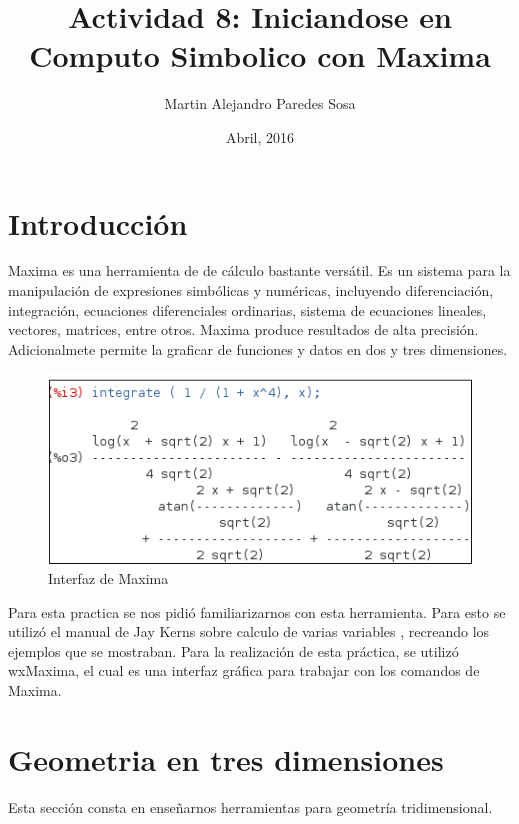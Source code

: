 \documentclass[12pt]{article}
\title{Actividad 8: Iniciandose en Computo Simbolico con Maxima}
\author{Martin Alejandro Paredes Sosa}
\date{Abril, 2016}
\begin{document}
\maketitle

\section{Introducción}
Maxima es una herramienta de de cálculo bastante versátil. Es un sistema para la manipulación de expresiones simbólicas y numéricas, incluyendo diferenciación, integración, ecuaciones diferenciales ordinarias, sistema de ecuaciones lineales, vectores, matrices, entre otros. Maxima produce resultados de alta precisión. Adicionalmete permite la graficar de funciones y datos en dos y tres dimensiones. \cite{M}

\begin{figure}[H]
\centering
\includegraphics[scale=0.75]{maxi.png}
\caption{Interfaz de Maxima}
\end{figure}

\hspace{0.5cm} Para esta practica se nos pidió familiarizarnos con esta herramienta. Para esto se utilizó el manual de Jay Kerns sobre calculo de varias variables \cite{JK}, recreando los ejemplos que se mostraban. Para la realización de esta práctica, se utilizó wxMaxima, el cual es una interfaz gráfica para trabajar con los comandos de Maxima.


\pagebreak


\section{Geometria en tres dimensiones}
Esta sección consta en enseñarnos herramientas para geometría tridimensional.
\end{document}
